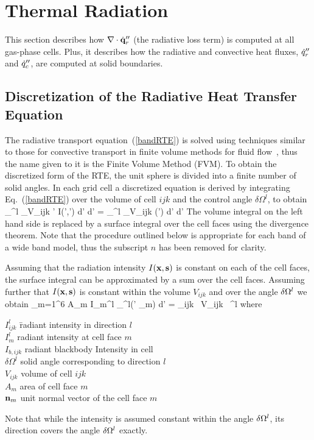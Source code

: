 \documentclass[11pt]{book}
\begin{document}
\clearpage
\section{Thermal Radiation}
\label{radnumericalmethodsection}

This section describes how $\nabla \cdot \dot{\bf q}_r''$ (the radiative loss term) is computed at all gas-phase cells. Plus, it describes how
the radiative and convective heat fluxes, $\dot{q}_r''$ and $\dot{q}_c''$, are computed at solid boundaries.

\subsection{Discretization of the Radiative Heat Transfer Equation}

The radiative transport equation~(\ref{bandRTE}) is solved using
techniques similar to those for convective transport in finite volume
methods for fluid flow~\cite{Raithby}, thus the name given to it is
the Finite Volume Method (FVM). To obtain the discretized form of the
RTE, the unit sphere is divided into a finite number of solid angles.
In each grid cell a discretized equation is derived by integrating
Eq.~(\ref{bandRTE}) over the volume of cell $ijk$ and the control
angle $\delta \Omega^l$, to obtain
\be
  \int_{\delta \Omega^l} \int_{V_{ijk}}
   \bs' \cdot \nabla I(\bx',\bs') d\bx' d\bs' =
   \int_{\delta \Omega^l} \int_{V_{ijk}} \kappa(\bx') \;
    \left[ I_{b}(\bx') - I(\bx',\bs') \right] d\bx' d\bs'
\ee
The volume integral on the left hand side is replaced by a surface
integral over the cell faces using the divergence theorem. Note that
the procedure outlined below is appropriate for each band of a wide
band model, thus the subscript $n$ has been removed for clarity.

Assuming that the radiation intensity $I({\bf x},{\bf s})$ is constant on each
of the cell faces, the surface integral can be approximated by a sum
over the cell faces.  Assuming further that $I({\bf x},{\bf s})$ is constant
within the volume $V_{ijk}$ and over the angle $\delta {\Omega}^l$ we
obtain
\be  \sum_{m=1}^6 A_m \; I_m^l \;
      \int_{\Omega^l}(\bs' \cdot \bn_m) d\bs'
   = \kappa_{ijk} \,
      \; V_{ijk} \,
     \delta \Omega^l   \label{RTEdiscrete2}
\ee
where
\begin{tabbing}
$I_{ijk}^l$ \hspace{1in}  \=  radiant intensity in direction $l$ \\
$I_m^l$                   \>  radiant intensity at cell face $m$ \\
$I_{b,ijk}$               \>  radiant blackbody Intensity in cell \\
$\delta \Omega^l$         \>  solid angle corresponding to direction $l$ \\
$V_{ijk}$                 \>  volume of cell $ijk$ \\
$A_m$                     \>  area of cell face $m$ \\
${\bf n}_m$                   \>  unit normal vector of the cell face $m$
\end{tabbing}
Note that while the intensity is assumed constant within
the angle $\delta {\Omega}^l$, its direction covers the angle $\delta {\Omega}^l$
exactly.
\end{document}
